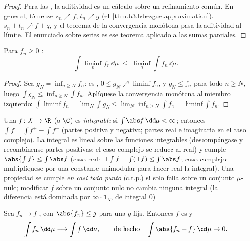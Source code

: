 \begin{proof}
Para las , la
aditividad es un cálculo sobre un refinamiento común. En general,
tómense $s_n \nearrow f$, $t_n \nearrow g$
(el~\cref{thm:b3:lebesgue:approximation}): $s_n + t_n \nearrow f +
g$, y el teorema de la convergencia monótona pasa la aditividad al
límite. El enunciado sobre series es ese teorema aplicado a las sumas
parciales.
\end{proof}

\begin{theorem}\label{thm:b3:lebesgue:fatou}
Para $f_n \geq 0$ :
\[
\int \liminf_n f_n \,\dd\mu \;\leq\; \liminf_n \int
f_n\,\dd\mu .
\]
\end{theorem}

\begin{proof}
Sea $g_N = \inf_{n\geq N}f_n$: es
, $0 \leq g_N \nearrow
\liminf f_n$, y $g_N \leq f_n$ para todo $n \geq N$, luego
$\int g_N \leq \inf_{n \geq N}\int f_n$. Aplíquese la convergencia
monótona al miembro izquierdo: $\int\liminf f_n = \lim_N\int g_N \leq
\lim_N\inf_{n\geq N}\int f_n = \liminf\int f_n$.
\end{proof}

\begin{definition}\label{def:b3:lebesgue:l1}
Una $f \colon X \to \R$  (o
$\C$) es \emph{integrable} si $\int\abs
f\,\dd\mu < \infty$; entonces $\int f = \int f^+ - \int f^-$ (partes
positiva y negativa; partes real e imaginaria en el caso complejo). La
integral es lineal sobre las funciones integrables (descompóngase y
recombínense partes positivas; el caso complejo se reduce al real) y
cumple $\abs{\int f} \leq
\int\abs f$ (caso real: $\pm\int f = \int(\pm f) \leq
\int\abs f$; caso complejo: multiplíquese por una constante unimodular
para hacer real la integral). Una propiedad se cumple \emph{en casi todo
punto} (c.t.p.) si solo falla sobre un
conjunto $\mu$-nulo; modificar $f$ sobre un conjunto nulo no cambia
ninguna integral (la diferencia está dominada por $\infty\cdot\mathbf
1_N$, de integral $0$).
\end{definition}

\begin{theorem}\label{thm:b3:lebesgue:dct}
Sea $f_n \to f$ , con $\abs{f_n} \leq g$  para una $g$ \emph{} fija.
Entonces $f$ es  y
\[
\int f_n\,\dd\mu \longrightarrow \int f\,\dd\mu,
\qquad\text{de hecho}\quad \int\abs{f_n - f}\,\dd\mu \to 0 .
\]
\end{theorem}

